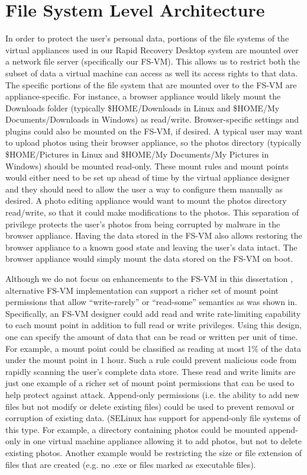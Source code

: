 \section{File System Level Architecture}

In order to protect the user's personal data, portions of the file systems of the virtual appliances used in our Rapid Recovery Desktop system are mounted over a network file server (specifically our FS-VM). This allows us to restrict both the subset of data a virtual machine can access as well its access rights to that data. The specific portions of the file system that are mounted over to the FS-VM are appliance-specific. For instance, a browser appliance would likely mount the Downloads folder (typically \$HOME/Downloads in Linux and \$HOME/My Documents/Downloads in Windows) as read/write. Browser-specific settings and plugins could also be mounted on the FS-VM, if desired. A typical user may want to upload photos using their browser appliance, so the photos directory (typically \$HOME/Pictures in Linux and \$HOME/My Documents/My Pictures in Windows) should be mounted read-only. These mount rules and mount points would either need to be set up ahead of time by the virtual appliance designer and they should need to allow the user a way to configure them manually as desired. A photo editing appliance would want to mount the photos directory read/write, so that it could make modifications to the photos. This separation of privilege protects the user's photos from being corrupted by malware in the browser appliance. Having the data stored in the FS-VM also allows restoring the browser appliance to a known good state and leaving the user's data intact. The browser appliance would simply mount the data stored on the FS-VM on boot.

Although we do not focus on enhancements to the FS-VM in this dissertation , alternative FS-VM implementation can support a richer set of mount point permissions that allow ``write-rarely'' or ``read-some'' semantics as was shown in\cite{rapid_recovery_paper_05}. Specifically, an FS-VM designer could add read and write rate-limiting capability to each mount point in addition to full read or write privileges. Using this design, one can specify the amount of data that can be read or written per unit of time. For example, a mount point could be classified as reading at most 1\% of the data under the mount point in 1 hour. Such a rule could prevent malicious code from rapidly scanning the user’s complete data store. These read and write limits are just one example of a richer set of mount point permissions that can be used to help protect against attack. Append-only permissions (i.e. the ability to add new files but not modify or delete existing files) could be used to prevent removal or corruption of existing data. (SELinux has support for append-only file systems of this type\cite{smalley_2001}. For example, a directory containing photos could be mounted append-only in one virtual machine appliance allowing it to add photos, but not to delete existing photos. Another example would be restricting the size or file extension of files that are created (e.g. no .exe or files marked as executable files).

